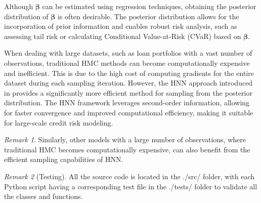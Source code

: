\documentclass[11pt,a4paper]{article}
\theoremstyle{remark}
\newtheorem{remark}{Remark}
\begin{document}
Although $\boldsymbol{\beta}$ can be estimated using regression techniques, obtaining the posterior distribution of $\boldsymbol{\beta}$ is often desirable. The posterior distribution allows for the incorporation of prior information and enables robust risk analysis, such as assessing tail risk or calculating Conditional Value-at-Risk (CVaR) based on $\boldsymbol{\beta}$.

When dealing with large datasets, such as loan portfolios with a vast number of observations, traditional HMC methods can become computationally expensive and inefficient. This is due to the high cost of computing gradients for the entire dataset during each sampling iteration. However, the HNN approach introduced in \cite{dhulipala2023efficient} provides a significantly more efficient method for sampling from the posterior distribution. The HNN framework leverages second-order information, allowing for faster convergence and improved computational efficiency, making it suitable for large-scale credit risk modeling.

\begin{remark}
	Similarly, other models with a large number of observations, where traditional HMC becomes computationally expensive, can also benefit from the efficient sampling capabilities of HNN.
\end{remark}

\begin{remark}[Testing]
	All the source code is located in the ./src/ folder, with each Python script having a corresponding test file in the ./tests/ folder to validate all the classes and functions.
\end{remark}



\end{document}
